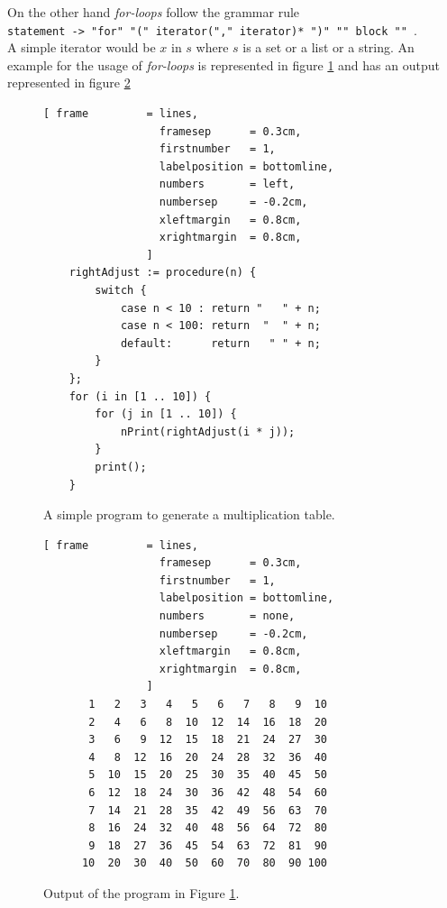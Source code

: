 \documentclass[11pt]{report}
\begin{document}
On the other hand \textsl{for-loops} follow the grammar rule
\\[0.2cm]
\hspace*{1.3cm}
\texttt{statement -> "for" "(" iterator("," iterator)* ")" "{" block "}" }.
\\[0.2cm]
A simple iterator would be $x$ in $s$ where $s$ is a set or a list or a string. An example for the usage of \textsl{for-loops} is represented in figure \ref{fig:multiplication-table.stlx} and has an output represented in figure \ref{fig:multiplication-table}
\begin{figure}[!ht]
\centering
\begin{Verbatim}[ frame         = lines, 
                  framesep      = 0.3cm, 
                  firstnumber   = 1,
                  labelposition = bottomline,
                  numbers       = left,
                  numbersep     = -0.2cm,
                  xleftmargin   = 0.8cm,
                  xrightmargin  = 0.8cm,
                ]
    rightAdjust := procedure(n) {
        switch {
            case n < 10 : return "   " + n;
            case n < 100: return  "  " + n;
            default:      return   " " + n;
        }
    };      
    for (i in [1 .. 10]) {
        for (j in [1 .. 10]) {
            nPrint(rightAdjust(i * j));
        }
        print();
    }
\end{Verbatim}
\vspace*{-0.3cm}
\caption{A simple program to generate a multiplication table.}
\label{fig:multiplication-table.stlx}
\end{figure}

\begin{figure}[!ht]
\centering
\begin{Verbatim}[ frame         = lines, 
                  framesep      = 0.3cm, 
                  firstnumber   = 1,
                  labelposition = bottomline,
                  numbers       = none,
                  numbersep     = -0.2cm,
                  xleftmargin   = 0.8cm,
                  xrightmargin  = 0.8cm,
                ]
       1   2   3   4   5   6   7   8   9  10
       2   4   6   8  10  12  14  16  18  20
       3   6   9  12  15  18  21  24  27  30
       4   8  12  16  20  24  28  32  36  40
       5  10  15  20  25  30  35  40  45  50
       6  12  18  24  30  36  42  48  54  60
       7  14  21  28  35  42  49  56  63  70
       8  16  24  32  40  48  56  64  72  80
       9  18  27  36  45  54  63  72  81  90
      10  20  30  40  50  60  70  80  90 100
\end{Verbatim}
\vspace*{-0.3cm}
\caption{Output of the program in Figure \ref{fig:multiplication-table.stlx}.}
\label{fig:multiplication-table}
\end{figure}
\pagebreak
\end{document}
